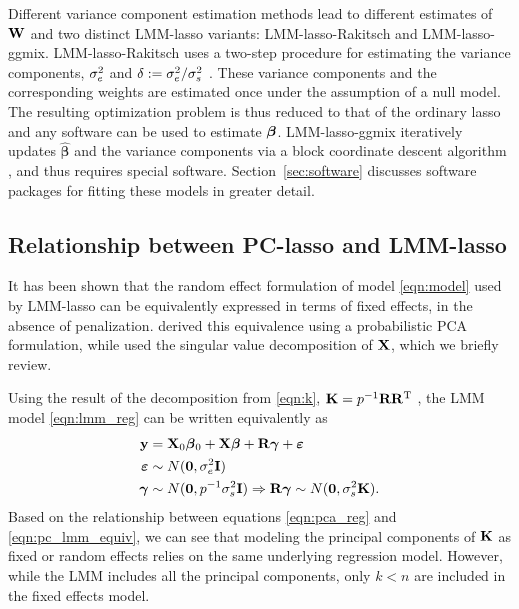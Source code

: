 Different variance component estimation methods lead to different estimates of $\mathbf{W}$ and two distinct LMM-lasso variants: LMM-lasso-Rakitsch and LMM-lasso-ggmix. LMM-lasso-Rakitsch uses a two-step procedure for estimating the variance components, $\sigma^2_e$ and $\delta := \sigma^2_e / \sigma^2_s$ \citep{rakitsch2013lasso}. These variance components and the corresponding weights are estimated once under the assumption of a null model. The resulting optimization problem is thus reduced to that of the ordinary lasso and any software can be used to estimate $\boldsymbol{\beta}{}$. LMM-lasso-ggmix iteratively updates $\widehat{\boldsymbol{\beta}}$ and the variance components via a block coordinate descent algorithm \citep{bhatnagar2020simultaneous}, and thus requires special software. Section~\ref{sec:software} discusses software packages for fitting these models in greater detail.

\subsection{Relationship between PC-lasso and LMM-lasso}

It has been shown that the random effect formulation of model \eqref{eqn:model} used by LMM-lasso can be equivalently expressed in terms of fixed effects, in the absence of penalization. \citet{zhang2015principal} derived this equivalence using a probabilistic PCA formulation, while \citet{hoffman2013correcting} used the singular value decomposition of $\mathbf{X}$, which we briefly review.

Using the result of the decomposition from \eqref{eqn:k}, $\mathbf{K} = p^{-1} \mathbf{R} \mathbf{R}^{\text{T}}$ , the LMM model \eqref{eqn:lmm_reg} can be written equivalently as
\begin{equation}
  \begin{aligned}
    \label{eqn:pc_lmm_equiv}
    \mathbf{y} &= \mathbf{X}_0 \boldsymbol{\beta}{}_0 + \mathbf{X} \boldsymbol{\beta}{} + \mathbf{R} \boldsymbol{\gamma} + \boldsymbol{\varepsilon}{} \\
    \boldsymbol{\varepsilon}{} &\sim N(\boldsymbol{0}, \sigma^2_e \mathbf{I}) \\
    \boldsymbol{\gamma} &\sim N(\boldsymbol{0}, p^{-1} \sigma^2_s \mathbf{I}) \Rightarrow \mathbf{R} \boldsymbol{\gamma} \sim N(\boldsymbol{0}, \sigma^2_s \mathbf{K}).
  \end{aligned}
\end{equation}
Based on the relationship between equations \eqref{eqn:pca_reg} and \eqref{eqn:pc_lmm_equiv}, we can see that modeling the principal components of $\mathbf{K}$ as fixed or random effects relies on the same underlying regression model. However, while the LMM includes all the principal components, only $k < n$ are included in the fixed effects model. 

